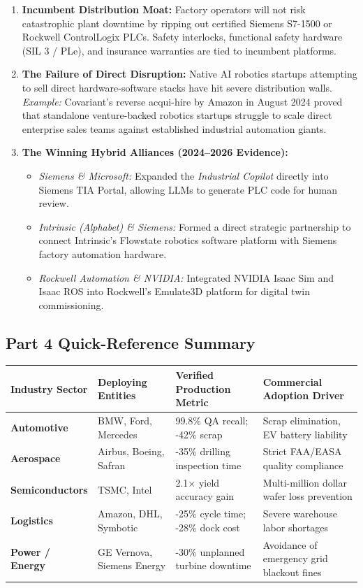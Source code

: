 \documentclass[11pt,a4paper]{article}
\begin{document}
\begin{enumerate}
    \item \textbf{Incumbent Distribution Moat:} Factory operators will not risk catastrophic plant downtime by ripping out certified Siemens S7-1500 or Rockwell ControlLogix PLCs. Safety interlocks, functional safety hardware (SIL 3 / PLe), and insurance warranties are tied to incumbent platforms.
    \item \textbf{The Failure of Direct Disruption:} Native AI robotics startups attempting to sell direct hardware-software stacks have hit severe distribution walls. \textit{Example:} Covariant's reverse acqui-hire by Amazon in August 2024 proved that standalone venture-backed robotics startups struggle to scale direct enterprise sales teams against established industrial automation giants.
    \item \textbf{The Winning Hybrid Alliances (2024--2026 Evidence):}
    \begin{itemize}
        \item \textit{Siemens \& Microsoft:} Expanded the \textit{Industrial Copilot} directly into Siemens TIA Portal, allowing LLMs to generate PLC code for human review.
        \item \textit{Intrinsic (Alphabet) \& Siemens:} Formed a direct strategic partnership to connect Intrinsic's Flowstate robotics software platform with Siemens factory automation hardware.
        \item \textit{Rockwell Automation \& NVIDIA:} Integrated NVIDIA Isaac Sim and Isaac ROS into Rockwell's Emulate3D platform for digital twin commissioning.
    \end{itemize}
\end{enumerate}

\subsection*{Part 4 Quick-Reference Summary}
\begin{table}[h!]
\centering
\scriptsize
\begin{tabularx}{\textwidth}{@{}l p{3.2cm} p{3.2cm} X@{}}
\toprule
\textbf{Industry Sector} & \textbf{Deploying Entities} & \textbf{Verified Production Metric} & \textbf{Commercial Adoption Driver} \\
\midrule
\textbf{Automotive} & BMW, Ford, Mercedes & 99.8\% QA recall; -42\% scrap & Scrap elimination, EV battery liability \\
\textbf{Aerospace} & Airbus, Boeing, Safran & -35\% drilling inspection time & Strict FAA/EASA quality compliance \\
\textbf{Semiconductors} & TSMC, Intel & 2.1$\times$ yield accuracy gain & Multi-million dollar wafer loss prevention \\
\textbf{Logistics} & Amazon, DHL, Symbotic & -25\% cycle time; -28\% dock cost & Severe warehouse labor shortages \\
\textbf{Power / Energy} & GE Vernova, Siemens Energy & -30\% unplanned turbine downtime & Avoidance of emergency grid blackout fines \\
\bottomrule
\end{tabularx}
\end{table}
\end{document}
